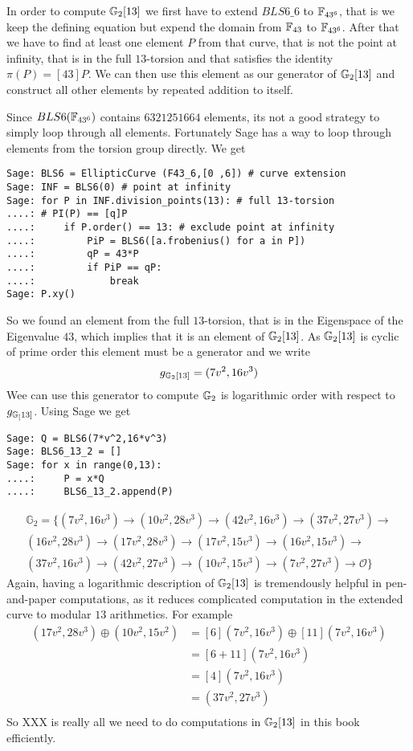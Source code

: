 In order to compute $\mathbb{G}_2[13]$ we first have to extend $BLS6\_6$ to $\mathbb{F}_{43^6}$, that is we keep the defining equation but expend the domain from $\mathbb{F}_{43}$ to $\mathbb{F}_{43^6}$. After that we have to find at least one element $P$ from that curve, that is not the point at infinity, that is in the full $13$-torsion and that satisfies the identity $\pi(P) = [43]P$. We can then use this element as our generator of $\mathbb{G}_2[13]$ and construct all other elements by repeated addition to itself.

Since $BLS6(\mathbb{F}_{43^6})$ contains $6321251664$ elements, its not a good strategy to simply loop through all elements. Fortunately Sage has a way to loop through elements from the torsion group directly. We get
\begin{verbatim}
Sage: BLS6 = EllipticCurve (F43_6,[0 ,6]) # curve extension
Sage: INF = BLS6(0) # point at infinity
Sage: for P in INF.division_points(13): # full 13-torsion
....: # PI(P) == [q]P
....:     if P.order() == 13: # exclude point at infinity
....:         PiP = BLS6([a.frobenius() for a in P])
....:         qP = 43*P
....:         if PiP == qP:
....:             break
Sage: P.xy()
\end{verbatim}
So we found an element from the full $13$-torsion, that is in the Eigenspace of the Eigenvalue $43$, which implies that it is an element of $\mathbb{G}_2[13]$. As $\mathbb{G}_2[13]$ is cyclic of prime order this element must be a generator and we write
\begin{equation}
g_{\mathbb{G}_2[13]} = (7v^2, 16v^3)
\end{equation}
Wee can use this generator to compute $\mathbb{G}_2$ is logarithmic order with respect to $g_{\mathbb{G}_[13]}$. Using Sage we get
\begin{verbatim}
Sage: Q = BLS6(7*v^2,16*v^3)
Sage: BLS6_13_2 = []
Sage: for x in range(0,13):
....:     P = x*Q
....:     BLS6_13_2.append(P)
\end{verbatim}
\begin{multline*}
\mathbb{G}_2=\{
(7v^2, 16v^3) \to
(10v^2, 28v^3)\to
(42v^2, 16v^3)\to
(37v^2, 27v^3)\to\\
(16v^2, 28v^3)\to
(17v^2, 28v^3)\to
(17v^2, 15v^3)\to
(16v^2, 15v^3)\to\\
(37v^2, 16v^3)\to
(42v^2, 27v^3)\to
(10v^2, 15v^3)\to
(7v^2, 27v^3)\to
\mathcal{O}\}
\end{multline*}
Again, having a logarithmic description of $\mathbb{G}_2[13]$ is tremendously helpful in pen-and-paper computations, as it reduces complicated computation in the extended curve to modular $13$ arithmetics. For example 
\begin{align*}
(17v^2,28v^3)\oplus (10v^2,15v^2)  & = [6](7v^2,16v^3)\oplus [11](7v^2,16v^3)\\
                      & = [6+11](7v^2,16v^3)\\
                      & = [4](7v^2,16v^3)\\
                      & = (37v^2,27v^3)\\
\end{align*}
So XXX is really all we need to do computations in $\mathbb{G}_2[13]$ in this book efficiently. 

